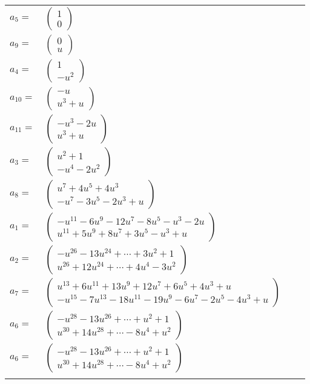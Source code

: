 \documentclass[1p]{elsarticle_modified}
\theoremstyle{definition}
\begin{document}
\begin{tabular}{m{7pt} m{180pt} m{7pt} m{180pt} }
\flushright $a_{5}=$&$\begin{pmatrix}1\\0\end{pmatrix}$ \\
\flushright $a_{9}=$&$\begin{pmatrix}0\\u\end{pmatrix}$ \\
\flushright $a_{4}=$&$\begin{pmatrix}1\\- u^2\end{pmatrix}$ \\
\flushright $a_{10}=$&$\begin{pmatrix}- u\\u^3+u\end{pmatrix}$ \\
\flushright $a_{11}=$&$\begin{pmatrix}- u^3-2 u\\u^3+u\end{pmatrix}$ \\
\flushright $a_{3}=$&$\begin{pmatrix}u^2+1\\- u^4-2 u^2\end{pmatrix}$ \\
\flushright $a_{8}=$&$\begin{pmatrix}u^7+4 u^5+4 u^3\\- u^7-3 u^5-2 u^3+u\end{pmatrix}$ \\
\flushright $a_{1}=$&$\begin{pmatrix}- u^{11}-6 u^9-12 u^7-8 u^5- u^3-2 u\\u^{11}+5 u^9+8 u^7+3 u^5- u^3+u\end{pmatrix}$ \\
\flushright $a_{2}=$&$\begin{pmatrix}- u^{26}-13 u^{24}+\cdots+3 u^2+1\\u^{26}+12 u^{24}+\cdots+4 u^4-3 u^2\end{pmatrix}$ \\
\flushright $a_{7}=$&$\begin{pmatrix}u^{13}+6 u^{11}+13 u^9+12 u^7+6 u^5+4 u^3+u\\- u^{15}-7 u^{13}-18 u^{11}-19 u^9-6 u^7-2 u^5-4 u^3+u\end{pmatrix}$ \\
\flushright $a_{6}=$&$\begin{pmatrix}- u^{28}-13 u^{26}+\cdots+u^2+1\\u^{30}+14 u^{28}+\cdots-8 u^4+u^2\end{pmatrix}$\\ \flushright $a_{6}=$&$\begin{pmatrix}- u^{28}-13 u^{26}+\cdots+u^2+1\\u^{30}+14 u^{28}+\cdots-8 u^4+u^2\end{pmatrix}$\\&\end{tabular}
\end{document}
